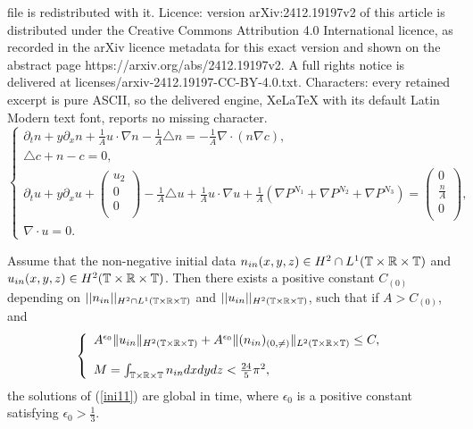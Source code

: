 \documentclass[10pt,a4paper]{amsart}
\begin{document}
file is redistributed with it. Licence: version arXiv:2412.19197v2 of this article is distributed under the Creative Commons Attribution 4.0 International licence, as recorded in the arXiv licence metadata for this exact version and shown on the abstract page https://arxiv.org/abs/2412.19197v2. A full rights notice is delivered at licenses/arxiv-2412.19197-CC-BY-4.0.txt. Characters: every retained excerpt is pure ASCII, so the delivered engine, XeLaTeX with its default Latin Modern text font, reports no missing character.
\begin{equation}\label{ini11}
	\left\{
	\begin{array}{lr}
		\partial_tn+y\partial_x n+\frac{1}{A}u\cdot\nabla n-\frac{1}{A}\triangle n=-\frac{1}{A}\nabla\cdot(n\nabla c), \\
		\triangle c+n-c=0, \\
		\partial_tu+y\partial_x u+\left(
		\begin{array}{c}
			u_2 \\
			0 \\
			0 \\
		\end{array}
		\right)
		-\frac{1}{A}\triangle u+\frac{1}{A}u\cdot\nabla u+\frac{1}{A}(\nabla P^{N_1}+\nabla P^{N_2}+\nabla P^{N_3})=\left(
		\begin{array}{c}
			0 \\
			\frac{n}{A} \\
			0 \\
		\end{array}
		\right), \\
		{\nabla \cdot u=0.}
	\end{array}
	\right.
\end{equation}

\begin{theorem}\label{result}
	Assume that the non-negative initial data $ n_{\rm in}(x,y,z)\in H^2\cap L^1(\mathbb{T}\times\mathbb{R}\times\mathbb{T})$
	and $ u_{\rm in}(x,y,z)\in H^2
	(\mathbb{T}\times\mathbb{R}\times\mathbb{T})$.
	Then there exists a positive constant $C_{(0)}$ depending on $||n_{\rm in}||_{H^2\cap L^1(\mathbb{T}\times\mathbb{R}\times\mathbb{T})}$ 
	and $||u_{\rm in}||_{H^2(\mathbb{T}\times\mathbb{R}\times\mathbb{T})}$, such that if $A>C_{(0)}$, and	
	\begin{equation*}
		\left\{
		\begin{array}{lr}
			A^{\epsilon_0}\|u_{\rm in}\|_{H^2(\mathbb{T}\times\mathbb{R}\times\mathbb{T})}
			+A^{\epsilon_0}\|(n_{\rm in})_{(0,\neq)}\|_{L^2(\mathbb{T}\times\mathbb{R}\times\mathbb{T})}\leq C, \\
			\\
			M = \int_{\mathbb{T}\times\mathbb{R}\times\mathbb{T}}n_{\rm in}dxdydz < \frac{24}{5}\pi^2,
		\end{array}
		\right.
	\end{equation*}
	the solutions of {\rm (\ref{ini11})} are global in time, where $\epsilon_0$ is a positive constant satisfying $\epsilon_0>\frac13$.
\end{theorem}
\end{document}
